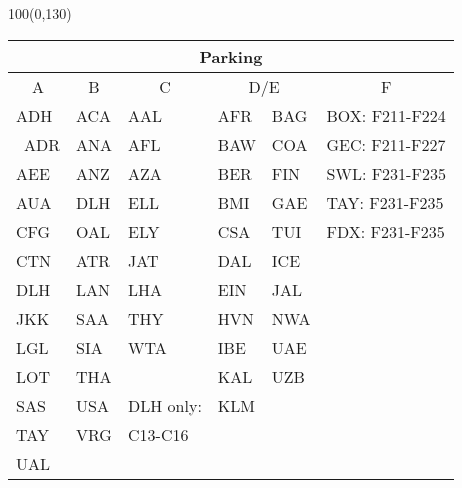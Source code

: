 \documentclass[10pt,landscape,a4paper]{article}
\begin{document}
\begin{textblock}{100}(0,130)
\footnotesize
\begin{table}[]
\begin{tabular}{|l|l|l|ll|l|}

\multicolumn{6}{c}{\textbf{Parking}}                                                                                           \\ \hline
\multicolumn{1}{|c|}{A} & \multicolumn{1}{c|}{B} & \multicolumn{1}{c|}{C} & \multicolumn{2}{c|}{D/E}    & \multicolumn{1}{c|}{F} \\ \hline
ADH                     & ACA                    & AAL                    & AFR                   & BAG & BOX: F211-F224         \\ \
ADR                     & ANA                    & AFL                    & BAW                   & COA & GEC: F211-F227         \\
AEE                     & ANZ                    & AZA                    & BER                   & FIN & SWL: F231-F235         \\
AUA                     & DLH                    & ELL                    & BMI                   & GAE & TAY: F231-F235         \\
CFG                     & OAL                    & ELY                    & CSA                   & TUI & FDX: F231-F235         \\
CTN                     & ATR                    & JAT                    & DAL                   & ICE &                        \\
DLH                     & LAN                    & LHA                    & EIN                   & JAL &                        \\
JKK                     & SAA                    & THY                    & HVN                   & NWA &                        \\
LGL                     & SIA                    & WTA                    & IBE                   & UAE &                        \\
LOT                     & THA                    &                        & KAL                   & UZB &                        \\
SAS                     & USA                    & DLH only:              & KLM                   &     &                        \\
TAY                     & VRG                    & C13-C16                &                       &     &                        \\
UAL                     &                        &                        & \multicolumn{1}{l}{} &     &                        \\ \hline
\end{tabular}
\end{table}
\end{textblock}
\end{document}
